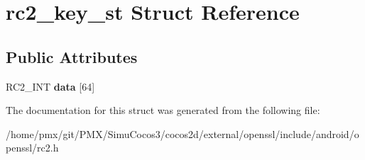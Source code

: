 \hypertarget{structrc2__key__st}{}\section{rc2\+\_\+key\+\_\+st Struct Reference}
\label{structrc2__key__st}
\subsection*{Public Attributes}
\begin{DoxyCompactItemize}
\item 
\mbox{\label{structrc2__key__st_a0f33a32ace5c32c08322b91445f17c1b}} 
R\+C2\+\_\+\+I\+NT {\bfseries data} \mbox{[}64\mbox{]}
\end{DoxyCompactItemize}


The documentation for this struct was generated from the following file\+:\begin{DoxyCompactItemize}
\item 
/home/pmx/git/\+P\+M\+X/\+Simu\+Cocos3/cocos2d/external/openssl/include/android/openssl/rc2.\+h\end{DoxyCompactItemize}
